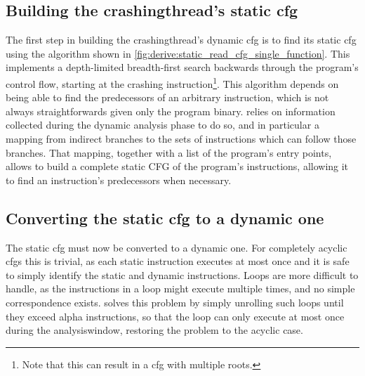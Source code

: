 \subsection[Building the \glsentrytext{crashingthread}'s static \glsentrytext{cfg}]{Building the \gls{crashingthread}'s static \gls{cfg}}
\label{sect:derive:build_static_cfg}

\noindent
The first step in building the \gls{crashingthread}'s dynamic
\gls{cfg} is to find its static \gls{cfg} using the algorithm shown in
\autoref{fig:derive:static_read_cfg_single_function}.  This implements
a depth-limited breadth-first search backwards through the program's
control flow, starting at the crashing instruction\footnote{Note that
  this can result in a \gls{cfg} with multiple roots.}.  This
algorithm depends on being able to find the predecessors of an
arbitrary instruction, which is not always straightforwards given only
the program binary.  {\Technique} relies on information collected
during the dynamic analysis phase to do so, and in particular a
mapping from indirect branches to the sets of instructions which can
follow those branches.  That mapping, together with a list of the
program's entry points, allows {\technique} to build a complete static
CFG of the program's instructions, allowing it to find an
instruction's predecessors when necessary.

\subsection[Converting the static \glsentrytext{cfg} to a dynamic one]{Converting the static \gls{cfg} to a dynamic one}
\label{sect:derive:handling_loops}

The static \gls{cfg} must now be converted to a dynamic one.  For
completely acyclic \glspl{cfg} this is trivial, as each static
instruction executes at most once and it is safe to simply identify
the static and dynamic instructions.  Loops are more difficult to
handle, as the instructions in a loop might execute multiple times,
and no simple correspondence exists.  {\Technique} solves this problem
by simply unrolling such loops until they exceed \gls{alpha}
instructions, so that the loop can only execute at most once during
the \gls{analysiswindow}, restoring the problem to the acyclic case.

